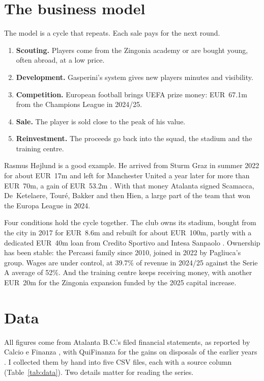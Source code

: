 \documentclass[11pt,a4paper]{article}
\begin{document}
\section{The business model}
The model is a cycle that repeats. Each sale pays for the next round.
\begin{enumerate}[leftmargin=1.5em,itemsep=2pt]
\item \textbf{Scouting.} Players come from the Zingonia academy or are bought young, often abroad, at a low price.
\item \textbf{Development.} Gasperini's system gives new players minutes and visibility.
\item \textbf{Competition.} European football brings UEFA prize money: EUR~67.1m from the Champions League in 2024/25.
\item \textbf{Sale.} The player is sold close to the peak of his value.
\item \textbf{Reinvestment.} The proceeds go back into the squad, the stadium and the training centre.
\end{enumerate}

Rasmus Højlund is a good example. He arrived from Sturm Graz in summer 2022 for about EUR~17m and left for Manchester United a year later for more than EUR~70m, a gain of EUR~53.2m \citep{cef_mercato2023}. With that money Atalanta signed Scamacca, De~Ketelaere, Touré, Bakker and then Hien, a large part of the team that won the Europa League in 2024.

Four conditions hold the cycle together. The club owns its stadium, bought from the city in 2017 for EUR~8.6m and rebuilt for about EUR~100m, partly with a dedicated EUR~40m loan from Credito Sportivo and Intesa Sanpaolo \citep{ilgiorno_stadio,italpress_stadio}. Ownership has been stable: the Percassi family since 2010, joined in 2022 by Pagliuca's group. Wages are under control, at 39.7\% of revenue in 2024/25 against the Serie A average of 52\%. And the training centre keeps receiving money, with another EUR~20m for the Zingonia expansion funded by the 2025 capital increase.

\section{Data}
All figures come from Atalanta B.C.'s filed financial statements, as reported by Calcio e Finanza \citep{cef_1620,cef_2021,cef_2324,cef_2425,cef_h1}, with QuiFinanza for the gains on disposals of the earlier years \citep{qf_plusvalenze}. I collected them by hand into five CSV files, each with a source column (Table~\ref{tab:data}). Two details matter for reading the series.
\end{document}
